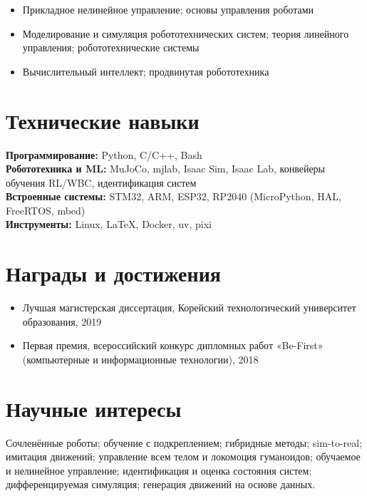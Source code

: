 \documentclass[11pt,a4paper]{article}
\begin{document}
\begin{itemize}[leftmargin=*, nosep, topsep=0.2em]
  \item Прикладное нелинейное управление; основы управления роботами
  \item Моделирование и симуляция робототехнических систем; теория линейного управления; робототехнические системы
  \item Вычислительный интеллект; продвинутая робототехника
\end{itemize}

\section{Технические навыки}

\textbf{Программирование:} Python, C/C++, Bash\\
\textbf{Робототехника и ML:} MuJoCo, mjlab, Isaac Sim, Isaac Lab, конвейеры обучения RL/WBC, идентификация систем\\
\textbf{Встроенные системы:} STM32, ARM, ESP32, RP2040 (MicroPython, HAL, FreeRTOS, mbed)\\
\textbf{Инструменты:} Linux, LaTeX, Docker, uv, pixi

\section{Награды и достижения}

\begin{itemize}[leftmargin=*, nosep, topsep=0.2em]
  \item Лучшая магистерская диссертация, Корейский технологический университет образования, 2019
  \item Первая премия, всероссийский конкурс дипломных работ «Be-First» (компьютерные и информационные технологии), 2018
\end{itemize}

\section{Научные интересы}

Сочленённые роботы; обучение с подкреплением; гибридные методы; sim-to-real; имитация движений; управление всем телом и локомоция гуманоидов; обучаемое и нелинейное управление; идентификация и оценка состояния систем; дифференцируемая симуляция; генерация движений на основе данных.
\end{document}

